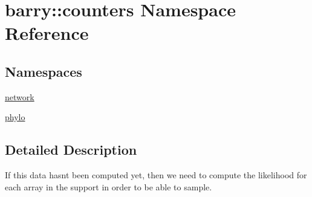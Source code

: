 \hypertarget{namespacebarry_1_1counters}{}\section{barry\+:\+:counters Namespace Reference}
\label{namespacebarry_1_1counters}
\subsection*{Namespaces}
\begin{DoxyCompactItemize}
\item 
 \hyperlink{namespacebarry_1_1counters_1_1network}{network}
\item 
 \hyperlink{namespacebarry_1_1counters_1_1phylo}{phylo}
\end{DoxyCompactItemize}


\subsection{Detailed Description}
If this data hasn\textquotesingle{}t been computed yet, then we need to compute the likelihood for each array in the support in order to be able to sample. 